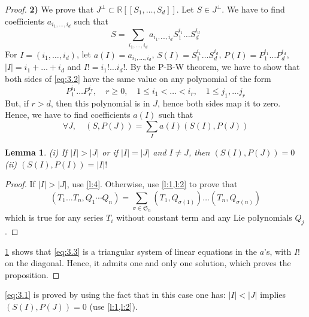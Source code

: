 \documentclass[a4paper,12pt]{article}
\newtheorem{lemma}{Lemma}
\newcommand{\R}{\mathbb{R}}
\begin{document}
\begin{proof}
	\textbf{2)} We prove that $J^{\perp} \subset \R\left[\left[S_1, \ldots, S_d\right]\right]$. Let $S \in J^{\perp}$. We have to find coefficients $a_{i_1, \ldots, i_d}$ such that
	\begin{equation*} \label{eq:3.2} \tag{2}
		S=\sum_{i_1, \ldots, i_d} a_{i_1, \ldots, i_d} S_1^{i_1} \ldots S_d^{i_d}
	\end{equation*}
	For $I=\left(i_1, \ldots, i_d\right)$, let $a(I)=a_{i_1, \ldots, i_d}$, $S(I)=S_1^{i_1} \ldots S_d^{i_d}$, $P(I)={P}_1^{i_1} \ldots {P}_{{d}}^{i_{{d}}}$, $|I|=i_1+\ldots+i_{{d}}$ and $I !=i_{1} ! \ldots i_d!$. By the P-B-W theorem, we have to show that both sides of \eqref{eq:3.2} have the same value on any polynomial of the form
	\begin{equation*}
		{P}_1^{i_1} \ldots {P}_{{r}}^{{i}_{{r}}}, \quad {r} \geq 0, \quad 1 \leq {i}_1<\ldots<{i}_{{r}}, \quad 1 \leq j_1, \ldots j_{{r}}
	\end{equation*}
	But, if ${r}>{d}$, then this polynomial is in ${J}$, hence both sides map it to zero. Hence, we have to find coefficients $a(I)$ such that
	\begin{equation} \label{eq:3.3} \tag{3}
		\forall {J}, \quad ({S}, {P}({J}))=\sum_{{I}} {a}({I})({S}({I}), {P}({J}))
	\end{equation}

	\begin{lemma} \label{l:5}
		(i) If $|I|>|J|$ or if $|I|=|J|$ and $I \neq J$, then $(S(I), P(J))=0$ \\
		(ii) $(S(I),P(I))=|I|!$
	\end{lemma}
	
	\begin{proof}
		If $|I|>|J|$, use \cref{l:4}. Otherwise, use \cref{l:1,l:2} to prove that
		\begin{equation*}
			\left(T_1 \ldots T_n, Q_1 \cdots Q_n\right)=\sum_{\sigma \in \mathfrak{S}_n}\left(T_1, Q_{\sigma(1)}\right) \ldots\left(T_n, Q_{\sigma(n)}\right)
		\end{equation*}
		which is true for any series ${T}_i$ without constant term and any Lie poIynomials ${Q}_j$.
	\end{proof}

	\cref{l:5} shows that \eqref{eq:3.3} is a triangular system of linear equations in the $a$'s, with $I!$ on the diagonal. Hence, it admits one and only one solution, which proves the proposition.
\end{proof}

\eqref{eq:3.1} is proved by using the fact that in this case one has: $|I|<|J|$ implies $(S(I), P(J))=0$ (use \cref{l:1,l:2}).
\end{document}
